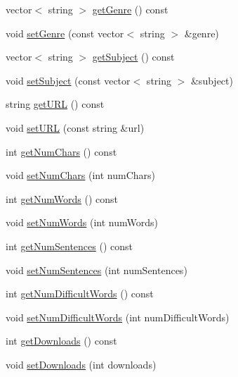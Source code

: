 \begin{DoxyCompactItemize}
vector$<$ string $>$ \mbox{\hyperlink{classbridges_1_1dataset_1_1_book_a26554290984472af3e3dbb9b138e6750}{get\+Genre}} () const
\item 
void \mbox{\hyperlink{classbridges_1_1dataset_1_1_book_a3acd969bba59827fb4e099565e7076bf}{set\+Genre}} (const vector$<$ string $>$ \&genre)
\item 
vector$<$ string $>$ \mbox{\hyperlink{classbridges_1_1dataset_1_1_book_ad68e9b4da931d1a1328fe1ee41acaa58}{get\+Subject}} () const
\item 
void \mbox{\hyperlink{classbridges_1_1dataset_1_1_book_a1473fa37374bbd66561fa02b7ff0d5cf}{set\+Subject}} (const vector$<$ string $>$ \&subject)
\item 
string \mbox{\hyperlink{classbridges_1_1dataset_1_1_book_a5e7dff3aad5acf540f8b0c487fd903a3}{get\+U\+RL}} () const
\item 
void \mbox{\hyperlink{classbridges_1_1dataset_1_1_book_a4d984e8854164f18944198293759319e}{set\+U\+RL}} (const string \&url)
\item 
int \mbox{\hyperlink{classbridges_1_1dataset_1_1_book_af8836440c237f2b8b7a9a0bd11c41d99}{get\+Num\+Chars}} () const
\item 
void \mbox{\hyperlink{classbridges_1_1dataset_1_1_book_af8dea379bd5a00af2257ce565ed6b643}{set\+Num\+Chars}} (int num\+Chars)
\item 
int \mbox{\hyperlink{classbridges_1_1dataset_1_1_book_a087d17660090ce28fbe7245094fb1711}{get\+Num\+Words}} () const
\item 
void \mbox{\hyperlink{classbridges_1_1dataset_1_1_book_afc1d3c8db63d4525e5070e61db5be7e1}{set\+Num\+Words}} (int num\+Words)
\item 
int \mbox{\hyperlink{classbridges_1_1dataset_1_1_book_a7a1b5fef3b464586e635a7444a9e4e41}{get\+Num\+Sentences}} () const
\item 
void \mbox{\hyperlink{classbridges_1_1dataset_1_1_book_a55be4872ed29dc79cdbe56189db6e5e6}{set\+Num\+Sentences}} (int num\+Sentences)
\item 
int \mbox{\hyperlink{classbridges_1_1dataset_1_1_book_aee63718cb1343108d9b7dd66cef208cb}{get\+Num\+Difficult\+Words}} () const
\item 
void \mbox{\hyperlink{classbridges_1_1dataset_1_1_book_a7974e9966b289f897f76dba445f5859e}{set\+Num\+Difficult\+Words}} (int num\+Difficult\+Words)
\item 
int \mbox{\hyperlink{classbridges_1_1dataset_1_1_book_afc1c412c45d2a07b3d5f074e4bbd353a}{get\+Downloads}} () const
\item 
void \mbox{\hyperlink{classbridges_1_1dataset_1_1_book_a998370a590bc5128faa755b5b7c1a85b}{set\+Downloads}} (int downloads)
\end{DoxyCompactItemize}



